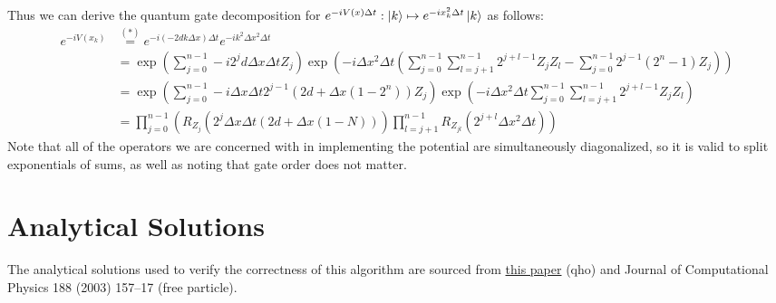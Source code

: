 \documentclass[10pt]{article}
\begin{document}
Thus we can derive the quantum gate decomposition for $e^{-i V(x) \Delta t}: \ket{k} \mapsto e^{-i x_k^2 \Delta t} \ket{k}$
as follows:
\begin{align*}
    e^{-i V(x_k)} &\overset{(*)}{=} e^{-i(-2dk \Delta x) \Delta t} e^{-i k^2 \Delta x^2 \Delta t} \\
    &= \exp\left(\sum_{j=0}^{n-1} -i 2^j d \Delta x \Delta t Z_j \right) 
    \exp\left( -i \Delta x^2 \Delta t \left( \sum_{j=0}^{n-1} \sum_{l=j+1}^{n-1} 2^{j+l-1} Z_j Z_l - \sum_{j=0}^{n-1} 2^{j-1}(2^n - 1)Z_j \right) \right) \\
    &= \exp\left( \sum_{j=0}^{n-1} -i \Delta x \Delta t 2^{j-1}(2d + \Delta x(1 - 2^n)) Z_j \right) \exp\left(-i \Delta x^2 \Delta t \sum_{j=0}^{n-1} \sum_{l=j+1}^{n-1} 2^{j+l-1} Z_j Z_l \right) \\
    &= \prod_{j=0}^{n-1}\left( R_{Z_j}\left(2^j \Delta x \Delta t(2d + \Delta x(1-N))\right) \prod_{l=j+1}^{n-1} R_{Z_{jl}} \left( 2^{j+l} \Delta x^2 \Delta t \right) \right)
\end{align*}
Note that all of the operators we are concerned with in implementing the potential
are simultaneously diagonalized, so it is valid to split exponentials of sums, as
well as noting that gate order does not matter. 
\section*{Analytical Solutions}
The analytical solutions used to verify the correctness of this algorithm are sourced
from \href{https://arxiv.org/pdf/quant-ph/0307046}{this paper} (qho) and Journal of Computational Physics 188 (2003) 157–17
(free particle).
\end{document}
